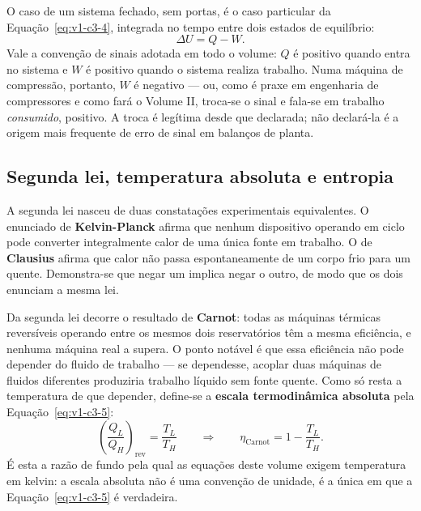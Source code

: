 \documentclass[12pt,a4paper]{article}
\numberwithin{equation}{section}
\numberwithin{table}{section}
\numberwithin{figure}{section}
\begin{document}
O caso de um sistema fechado, sem portas, é o caso particular da
Equação~\eqref{eq:v1-c3-4}, integrada no tempo entre dois estados de
equilíbrio:
\begin{equation}\label{eq:v1-c3-4}
\Delta U = Q - W .
\end{equation}
Vale a convenção de sinais adotada em todo o volume: $Q$ é positivo quando
entra no sistema e $W$ é positivo quando o sistema realiza trabalho. Numa
máquina de compressão, portanto, $W$ é negativo --- ou, como é praxe em
engenharia de compressores e como fará o Volume II, troca-se o sinal e fala-se
em trabalho \emph{consumido}, positivo. A troca é legítima desde que
declarada; não declará-la é a origem mais frequente de erro de sinal em
balanços de planta.

\subsection{Segunda lei, temperatura absoluta e entropia}\label{sub:v1-c3-segunda}

A segunda lei nasceu de duas constatações experimentais equivalentes.
O enunciado de \textbf{Kelvin-Planck} afirma que nenhum dispositivo operando em
ciclo pode converter integralmente calor de uma única fonte em trabalho. O de
\textbf{Clausius} afirma que calor não passa espontaneamente de um corpo frio
para um quente. Demonstra-se que negar um implica negar o outro, de modo que os
dois enunciam a mesma lei.

Da segunda lei decorre o resultado de \textbf{Carnot}: todas as máquinas
térmicas reversíveis operando entre os mesmos dois reservatórios têm a mesma
eficiência, e nenhuma máquina real a supera. O ponto notável é que essa
eficiência não pode depender do fluido de trabalho --- se dependesse, acoplar
duas máquinas de fluidos diferentes produziria trabalho líquido sem fonte
quente. Como só resta a temperatura de que depender, define-se a \textbf{escala
termodinâmica absoluta} pela Equação~\eqref{eq:v1-c3-5}:
\begin{equation}\label{eq:v1-c3-5}
\left(\frac{Q_L}{Q_H}\right)_{\text{rev}} = \frac{T_L}{T_H}
\qquad\Longrightarrow\qquad
\eta_{\text{Carnot}} = 1 - \frac{T_L}{T_H} .
\end{equation}
É esta a razão de fundo pela qual as equações deste volume exigem temperatura
em kelvin: a escala absoluta não é uma convenção de unidade, é a única em que a
Equação~\eqref{eq:v1-c3-5} é verdadeira.
\end{document}
